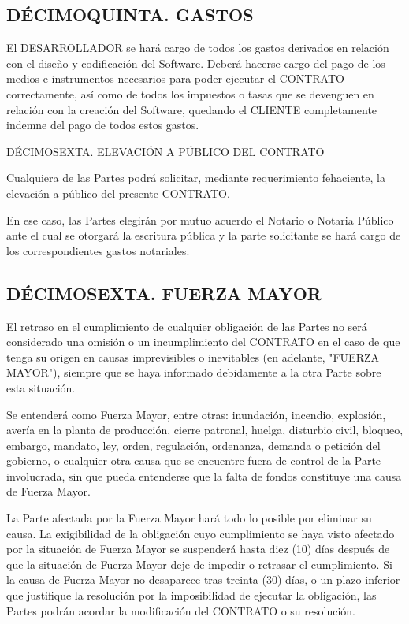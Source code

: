\documentclass[a4paper,11pt]{report}
\begin{document}
	\subsection*{DÉCIMOQUINTA. GASTOS}

	El DESARROLLADOR se hará cargo de todos los gastos derivados en relación
	con el diseño y codificación del Software. Deberá hacerse cargo del pago
	de los medios e instrumentos necesarios para poder ejecutar el CONTRATO
	correctamente, así como de todos los impuestos o tasas que se devenguen
	en relación con la creación del Software, quedando el CLIENTE
	completamente indemne del pago de todos estos gastos.

	DÉCIMOSEXTA. ELEVACIÓN A PÚBLICO DEL CONTRATO

	Cualquiera de las Partes podrá solicitar, mediante requerimiento
	fehaciente, la elevación a público del presente CONTRATO.

	En ese caso, las Partes elegirán por mutuo acuerdo el Notario o Notaria
	Público ante el cual se otorgará la escritura pública y la parte
	solicitante se hará cargo de los correspondientes gastos notariales.

	\subsection*{DÉCIMOSEXTA. FUERZA MAYOR}

	El retraso en el cumplimiento de cualquier obligación de las Partes no
	será considerado una omisión o un incumplimiento del CONTRATO en el caso
	de que tenga su origen en causas imprevisibles o inevitables (en
	adelante, "FUERZA MAYOR"), siempre que se haya informado debidamente a
	la otra Parte sobre esta situación.

	Se entenderá como Fuerza Mayor, entre otras: inundación, incendio,
	explosión, avería en la planta de producción, cierre patronal, huelga,
	disturbio civil, bloqueo, embargo, mandato, ley, orden, regulación,
	ordenanza, demanda o petición del gobierno, o cualquier otra causa que
	se encuentre fuera de control de la Parte involucrada, sin que pueda
	entenderse que la falta de fondos constituye una causa de Fuerza Mayor.

	La Parte afectada por la Fuerza Mayor hará todo lo posible por eliminar
	su causa. La exigibilidad de la obligación cuyo cumplimiento se haya
	visto afectado por la situación de Fuerza Mayor se suspenderá hasta diez
	(10) días después de que la situación de Fuerza Mayor deje de impedir o
	retrasar el cumplimiento. Si la causa de Fuerza Mayor no desaparece tras
	treinta (30) días, o un plazo inferior que justifique la resolución por
	la imposibilidad de ejecutar la obligación, las Partes podrán acordar la
	modificación del CONTRATO o su resolución.
\end{document}
